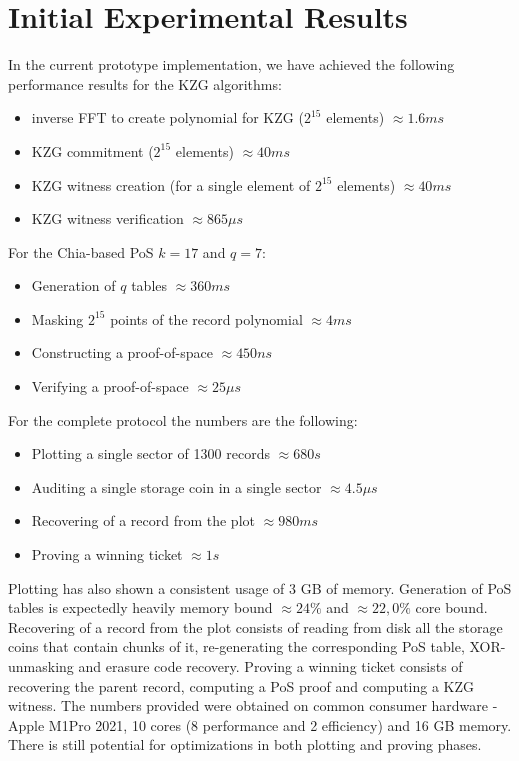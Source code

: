 \documentclass[conference]{IEEEtran}
\begin{document}
\section{Initial Experimental Results}

In the current prototype implementation, we have achieved the following performance results for the KZG algorithms: 
\begin{itemize}
    \item inverse FFT to create polynomial for KZG ($2^{15}$ elements) $\approx 1.6 ms$
    \item KZG commitment ($2^{15}$ elements) $\approx 40 ms$
    \item KZG witness creation (for a single element of $2^{15}$ elements) $\approx40 ms$
    \item KZG witness verification $\approx 865 \mu s$
\end{itemize}
For the Chia-based PoS $k = 17$ and $q = 7$:
\begin{itemize}
    \item Generation of $q$ tables $\approx 360 ms$
    \item Masking $2^{15}$ points of the record polynomial $\approx 4 ms$
    \item Constructing a proof-of-space $\approx 450 ns$
    \item Verifying a proof-of-space $\approx 25 \mu s$
\end{itemize}    
For the complete protocol the numbers are the following:
\begin{itemize}
    \item Plotting a single sector of 1300 records $\approx 680 s$
    \item Auditing a single storage coin in a single sector $\approx 4.5 \mu s$
    \item Recovering of a record from the plot $\approx 980 ms$
    \item Proving a winning ticket $\approx 1 s$
\end{itemize}
Plotting has also shown a consistent usage of 3 GB of memory. Generation of PoS tables is expectedly heavily memory bound $\approx24\%$ and $\approx 22,0\%$ core bound.                Recovering of a record from the plot consists of reading from disk all the storage coins that contain chunks of it, re-generating the corresponding PoS table, XOR-unmasking and erasure code recovery. Proving a winning ticket consists of recovering the parent record, computing a PoS proof and computing a KZG witness.
The numbers provided were obtained on common consumer hardware - Apple M1Pro 2021, 10 cores (8 performance and 2 efficiency) and 16 GB memory. There is still potential for optimizations in both plotting and proving phases. 
\end{document}
